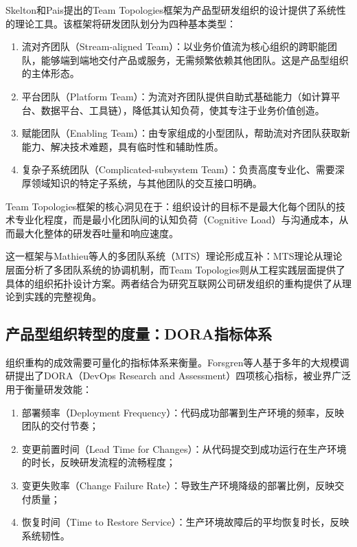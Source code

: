 Skelton和Pais\cite{skelton2019team}提出的Team Topologies框架为产品型研发组织的设计提供了系统性的理论工具。该框架将研发团队划分为四种基本类型：

\begin{enumerate}
\item 流对齐团队（Stream-aligned Team）：以业务价值流为核心组织的跨职能团队，能够端到端地交付产品或服务，无需频繁依赖其他团队。这是产品型组织的主体形态。
\item 平台团队（Platform Team）：为流对齐团队提供自助式基础能力（如计算平台、数据平台、工具链），降低其认知负荷，使其专注于业务价值创造。
\item 赋能团队（Enabling Team）：由专家组成的小型团队，帮助流对齐团队获取新能力、解决技术难题，具有临时性和辅助性质。
\item 复杂子系统团队（Complicated-subsystem Team）：负责高度专业化、需要深厚领域知识的特定子系统，与其他团队的交互接口明确。
\end{enumerate}

Team Topologies框架的核心洞见在于：组织设计的目标不是最大化每个团队的技术专业化程度，而是最小化团队间的认知负荷（Cognitive Load）与沟通成本，从而最大化整体的研发吞吐量和响应速度。

这一框架与Mathieu等人\cite{mathieu2008team}的多团队系统（MTS）理论形成互补：MTS理论从理论层面分析了多团队系统的协调机制，而Team Topologies则从工程实践层面提供了具体的组织拓扑设计方案。两者结合为研究互联网公司研发组织的重构提供了从理论到实践的完整视角。

\subsection{产品型组织转型的度量：DORA指标体系}

组织重构的成效需要可量化的指标体系来衡量。Forsgren等人\cite{forsgren2018accelerate}基于多年的大规模调研提出了DORA（DevOps Research and Assessment）四项核心指标，被业界广泛用于衡量研发效能：

\begin{enumerate}
\item 部署频率（Deployment Frequency）：代码成功部署到生产环境的频率，反映团队的交付节奏；
\item 变更前置时间（Lead Time for Changes）：从代码提交到成功运行在生产环境的时长，反映研发流程的流畅程度；
\item 变更失败率（Change Failure Rate）：导致生产环境降级的部署比例，反映交付质量；
\item 恢复时间（Time to Restore Service）：生产环境故障后的平均恢复时长，反映系统韧性。
\end{enumerate}

